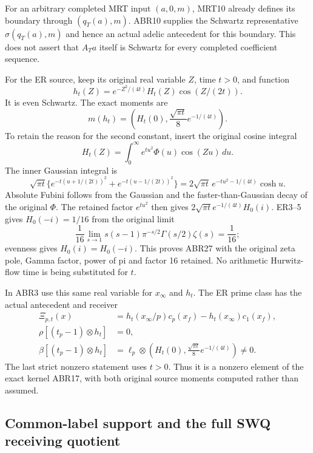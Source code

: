 \documentclass[11pt]{article}
\begin{document}
For an arbitrary completed MRT input $(a,0,m)$, MRT10 already
defines its boundary through $(q_T(a),m)$. ABR10 supplies the
Schwartz representative $\sigma(q_T(a),m)$ and hence an actual
adelic antecedent for this boundary. This does not assert that
$A_Ta$ itself is Schwartz for every completed coefficient sequence.

For the ER source, keep its original real variable $Z$, time $t>0$,
and function
\begin{equation}\tag{ABR26}
 h_t(Z)=e^{-Z^2/(4t)}H_t(Z)\cos(Z/(2t)).
\end{equation}
It is even Schwartz. The exact moments are
\begin{equation}\tag{ABR27}
 m(h_t)=\left(H_t(0),\frac{\sqrt{\pi t}}8e^{-1/(4t)}\right).
\end{equation}
To retain the reason for the second constant, insert the original
cosine integral \[H_t(Z)=\int_0^\infty e^{tu^2}\Phi(u)\cos(Zu)\,du.\]
The inner Gaussian integral is
\[
 \sqrt{\pi t}\{e^{-t(u+1/(2t))^2}+e^{-t(u-1/(2t))^2}\}
 =2\sqrt{\pi t}\,e^{-tu^2-1/(4t)}\cosh u.
\]
Absolute Fubini follows from the Gaussian and the faster-than-Gaussian
decay of the original $\Phi$. The retained factor $e^{tu^2}$
then gives $2\sqrt{\pi t}e^{-1/(4t)}H_0(i)$.
ER3--5 gives $H_0(-i)=1/16$ from the original limit
\[
 \frac1{16}\lim_{s\to1}
 s(s-1)\pi^{-s/2}\Gamma(s/2)\zeta(s)=\frac1{16};
\]
evenness gives $H_0(i)=H_0(-i)$. This proves ABR27 with the
original zeta pole, Gamma factor, power of pi and factor 16 retained.
No arithmetic Hurwitz-flow time is being substituted for $t$.

In ABR3 use this same real variable for $x_\infty$ and $h_t$.
The ER prime class has the actual antecedent and receiver
\begin{equation}\tag{ABR28}
 \begin{split}
 \Xi_{p,t}(x)
   &=h_t(x_\infty/p)c_p(x_f)-h_t(x_\infty)c_1(x_f),\\
 \rho[(t_p-1)\otimes h_t]&=0,\\
 \beta[(t_p-1)\otimes h_t]
   &=\ell_p\otimes
       \left(H_t(0),\frac{\sqrt{\pi t}}8e^{-1/(4t)}\right)\ne0.
 \end{split}
\end{equation}
The last strict nonzero statement uses $t>0$. Thus it is a
nonzero element of the exact kernel ABR17, with both original
source moments computed rather than assumed.

\subsection{Common-label support and the full SWQ receiving quotient}
\end{document}

